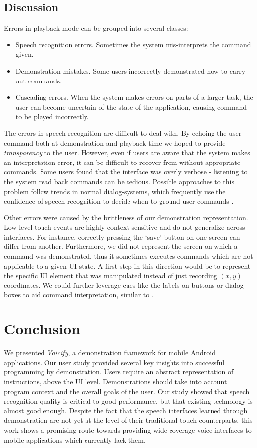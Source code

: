 \documentclass[letterpaper]{article}
\begin{document}
\subsection{Discussion}
Errors in playback mode can be
grouped into several classes:
\begin{itemize}
\item Speech recognition errors. Sometimes the system mis-interprets the command given.
\item Demonstration mistakes. Some users incorrectly demonstrated how to carry out commands.
\item Cascading errors. When the system makes errors on parts of a larger task, the user can become uncertain of the state of the application, causing command to be played incorrectly.
\end{itemize}
The errors in speech recognition are difficult to deal with. By echoing the user command both at demonstration and playback time we hoped to provide \emph{transparency} to the user.
However, even if users are aware that the system makes an interpretation error, it can be difficult to recover from without appropriate commands. Some users found that the
interface was overly verbose - listening to the system read back commands can be tedious. Possible approaches to this problem follow trends in normal dialog-systems, which frequently
use the confidence of speech recognition to decide when to ground user commands \cite{DBLP:journals/csl/YoungGKMSTY10}.

Other errors were caused by the brittleness of our demonstration representation. Low-level touch
events are highly context sensitive and do not generalize across interfaces. For instance,
correctly pressing the `save' button on one screen can differ from another. Furthermore, we did
not represent the screen on which a command was demonstrated, thus it sometimes executes  commands which 
are not applicable to a given UI state. A first step in this direction would be to represent the 
specific UI element that was manipulated instead of just recording $(x,y)$ coordinates. We could 
further leverage cues like the labels on buttons or dialog boxes to aid command interpretation,
similar to \cite{DBLP:conf/acl/BranavanCZB09}.



\section{Conclusion}
We presented \emph{Voicify}, a demonstration framework for mobile Android applications.
Our user study provided several key insights into successful programming by demonstration.
Users require an abstract representation of instructions, above the UI level. Demonstrations
should take into account program context and the overall goals of the user.
Our study showed that speech recognition quality is critical to good performance, but that
existing technology is almost good enough.
Despite the fact that the speech interfaces learned through demonstration are not yet at the
level of their traditional touch counterparts, this work shows a promising route
towards providing wide-coverage voice interfaces to mobile applications which currently lack them.


\end{document}
